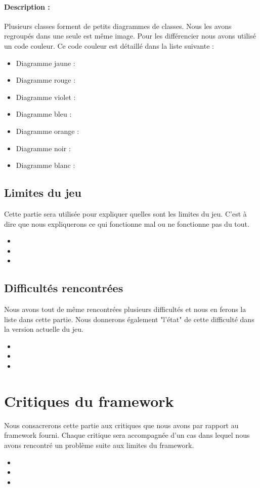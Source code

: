 \documentclass[a4paper,11pt]{article}
\begin{document}
		\paragraph{Description :}
		Plusieurs classes forment de petits diagrammes de classes. Nous les avons regroupés dans une seule est même image. Pour les différencier
		nous avons utilisé un code couleur. Ce code couleur est détaillé dans la liste suivante : \\
		\begin{itemize}
		\item Diagramme jaune :
		\item Diagramme rouge :
		\item Diagramme violet :
		\item Diagramme bleu :
		\item Diagramme orange :
		\item Diagramme noir :
		\item Diagramme blanc :
		\end{itemize}
		
		
	
\subsection{Limites du jeu}
Cette partie sera utilisée pour expliquer quelles sont les limites du jeu. C'est à dire que nous expliquerons ce qui fonctionne mal ou ne fonctionne pas du tout.
\begin{itemize}
\item
\item
\item
\end{itemize}

\subsection{Difficultés rencontrées}
Nous avons tout de même rencontrées plusieurs difficultés et nous en ferons la liste dans cette partie. Nous donnerons également "l'état" de cette difficulté dans la version actuelle du jeu.
\begin{itemize}
\item
\item
\item
\end{itemize}


\section{Critiques du framework }
Nous consacrerons cette partie aux critiques que nous avons par rapport au framework fourni. Chaque critique sera accompagnée d'un cas dans lequel nous avons rencontré un problème suite aux limites du framework.
\begin{itemize}
\item
\item
\item
\end{itemize}

\end{document}

